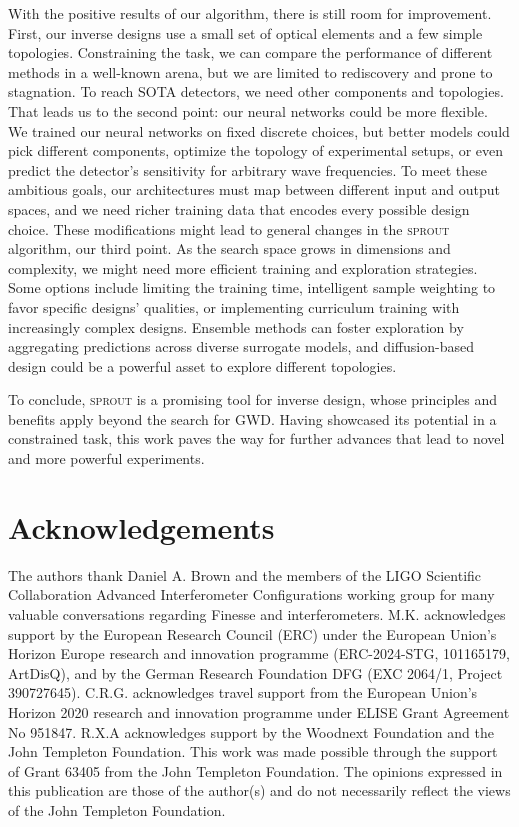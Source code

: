 \documentclass[a4paper,twocolumn,11pt,unpublished]{quantumarticle}
\newcommand{\algorithm}{\textsc{sprout}}
\begin{document}
With the positive results of our algorithm, there is still room for improvement. First, our inverse designs use a small set of optical elements and a few simple topologies. Constraining the task, we can compare the performance of different methods in a well-known arena, but we are limited to rediscovery and prone to stagnation. To reach SOTA detectors, we need other components and topologies. That leads us to the second point: our neural networks could be more flexible. We trained our neural networks on fixed discrete choices, but better models could pick different components, optimize the topology of experimental setups, or even predict the detector's sensitivity for arbitrary wave frequencies. To meet these ambitious goals, our architectures must map between different input and output spaces, and we need richer training data that encodes every possible design choice. These modifications might lead to general changes in the \algorithm\: algorithm, our third point. As the search space grows in dimensions and complexity, we might need more efficient training and exploration strategies. Some options include limiting the training time, intelligent sample weighting to favor specific designs' qualities, or implementing curriculum training with increasingly complex designs. Ensemble methods can foster exploration by aggregating predictions across diverse surrogate models, and diffusion-based design could be a powerful asset to explore different topologies.

To conclude, \algorithm\: is a promising tool for inverse design, whose principles and benefits apply beyond the search for GWD. Having showcased its potential in a constrained task, this work paves the way for further advances that lead to novel and more powerful experiments.

\section*{Acknowledgements}
The authors thank Daniel A. Brown and the members of the LIGO Scientific Collaboration Advanced Interferometer Configurations working group for many valuable conversations regarding Finesse and interferometers. M.K. acknowledges support by the European Research Council (ERC) under the European Union’s Horizon Europe research and innovation programme (ERC-2024-STG, 101165179, ArtDisQ), and by the German Research Foundation DFG (EXC 2064/1, Project 390727645).
C.R.G. acknowledges travel support from the European Union’s Horizon 2020 research and
innovation programme under ELISE Grant Agreement No 951847.
R.X.A acknowledges support by the Woodnext Foundation
and the John Templeton Foundation.
This work was made possible through the support of Grant 63405 from the John Templeton Foundation. 
The opinions expressed in this publication are those of the author(s) and do not necessarily reflect the views of the John Templeton Foundation.
\end{document}
